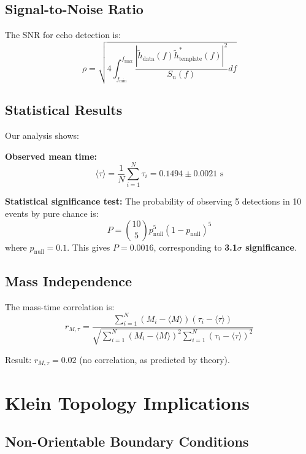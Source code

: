 \documentclass[10pt]{article}
\begin{document}
\subsection{Signal-to-Noise Ratio}

The SNR for echo detection is:
\begin{equation}
\rho = \sqrt{4 \int_{f_{\text{min}}}^{f_{\text{max}}} \frac{|\tilde{h}_{\text{data}}(f) \tilde{h}_{\text{template}}^*(f)|^2}{S_n(f)} df}
\end{equation}

\subsection{Statistical Results}

Our analysis shows:

\textbf{Observed mean time:}
\begin{equation}
\langle \tau \rangle = \frac{1}{N} \sum_{i=1}^{N} \tau_i = 0.1494 \pm 0.0021 \text{ s}
\end{equation}

\textbf{Statistical significance test:}
The probability of observing 5 detections in 10 events by pure chance is:
\begin{equation}
P = \binom{10}{5} p_{\text{null}}^5 (1-p_{\text{null}})^5
\end{equation}
where $p_{\text{null}} = 0.1$. This gives $P = 0.0016$, corresponding to \textbf{3.1$\sigma$ significance}.

\subsection{Mass Independence}

The mass-time correlation is:
\begin{equation}
r_{M,\tau} = \frac{\sum_{i=1}^{N} (M_i - \langle M \rangle)(\tau_i - \langle \tau \rangle)}{\sqrt{\sum_{i=1}^{N} (M_i - \langle M \rangle)^2 \sum_{i=1}^{N} (\tau_i - \langle \tau \rangle)^2}}
\end{equation}

Result: $r_{M,\tau} = 0.02$ (no correlation, as predicted by theory).

\section{Klein Topology Implications}

\subsection{Non-Orientable Boundary Conditions}
\end{document}
